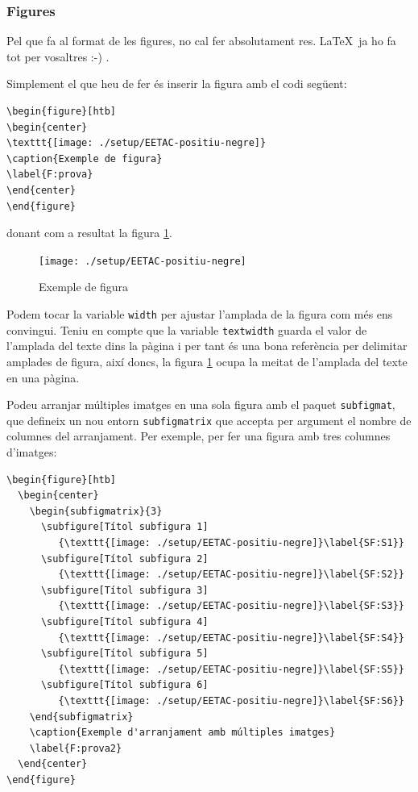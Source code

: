\subsubsection{Figures}

Pel que fa al format de les figures, no cal fer absolutament res. \LaTeX \ ja ho fa tot per vosaltres :-) . 

Simplement el que heu de fer és inserir la figura amb el codi següent:

\begin{verbatim}
\begin{figure}[htb]
\begin{center}
\texttt{[image: ./setup/EETAC-positiu-negre]}
\caption{Exemple de figura}
\label{F:prova}
\end{center}
\end{figure}
\end{verbatim}

donant com a resultat la figura \ref{F:prova}.

\begin{figure}[htb]
\begin{center}
\texttt{[image: ./setup/EETAC-positiu-negre]}
\caption{Exemple de figura}
\label{F:prova}
\end{center}
\end{figure}

Podem tocar la variable \texttt{width} per ajustar l'amplada de la figura com més ens convingui. Teniu en compte que la variable \texttt{textwidth} guarda el valor de l'amplada del texte dins la pàgina i per tant és una bona referència per delimitar amplades de figura, així doncs, la figura \ref{F:prova} ocupa la meitat de l'amplada del texte en una pàgina. 

Podeu arranjar múltiples imatges en una sola figura amb el paquet \texttt{subfigmat}, que defineix un nou entorn \texttt{subfigmatrix} que accepta per argument el nombre de columnes del arranjament. Per exemple, per fer una figura amb tres columnes d'imatges:

\begin{verbatim}
\begin{figure}[htb]
  \begin{center}
    \begin{subfigmatrix}{3}
      \subfigure[Títol subfigura 1]
         {\texttt{[image: ./setup/EETAC-positiu-negre]}\label{SF:S1}} 
      \subfigure[Títol subfigura 2]
         {\texttt{[image: ./setup/EETAC-positiu-negre]}\label{SF:S2}} 
      \subfigure[Títol subfigura 3]
         {\texttt{[image: ./setup/EETAC-positiu-negre]}\label{SF:S3}} 
      \subfigure[Títol subfigura 4]
         {\texttt{[image: ./setup/EETAC-positiu-negre]}\label{SF:S4}} 
      \subfigure[Títol subfigura 5]
         {\texttt{[image: ./setup/EETAC-positiu-negre]}\label{SF:S5}} 
      \subfigure[Títol subfigura 6]
         {\texttt{[image: ./setup/EETAC-positiu-negre]}\label{SF:S6}} 
    \end{subfigmatrix}
    \caption{Exemple d'arranjament amb múltiples imatges}
    \label{F:prova2}
  \end{center}
\end{figure}
\end{verbatim}

